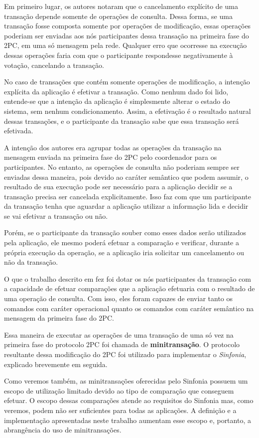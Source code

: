 \documentclass[11pt,twoside,a4paper]{book}
\begin{document}
Em primeiro lugar, os autores notaram que o cancelamento explícito de uma transação depende somente de operações de consulta. Dessa forma, se uma transação fosse composta somente por operações de modificação, essas operações poderiam ser enviadas aos nós participantes dessa transação na primeira fase do 2PC, em uma só mensagem pela rede. Qualquer erro que ocorresse na execução dessas operações faria com que o participante respondesse negativamente à votação, cancelando a transação.

No caso de transações que contém somente operações de modificação, a intenção explícita da aplicação é efetivar a transação. Como nenhum dado foi lido, entende-se que a intenção da aplicação é simplesmente alterar o estado do sistema, sem nenhum condicionamento. Assim, a efetivação é o resultado natural dessas transações, e o participante da transação sabe que essa transação será efetivada.

A intenção dos autores era agrupar todas as operações da transação na mensagem enviada na primeira fase do 2PC pelo coordenador para os participantes. No entanto, as operações de consulta não poderiam sempre ser enviadas dessa maneira, pois devido ao caráter semântico que podem assumir, o resultado de sua execução pode ser necessário para a aplicação decidir se a transação precisa ser cancelada explicitamente. Isso faz com que um participante da transação tenha que aguardar a aplicação utilizar a informação lida e decidir se vai efetivar a transação ou não.

Porém, se o participante da transação souber como esses dados serão utilizados pela aplicação, ele mesmo poderá efetuar a comparação e verificar, durante a própria execução da operação, se a aplicação iria solicitar um cancelamento ou não da transação.

O que o trabalho descrito em \cite{sinfonia} fez foi dotar os nós participantes da transação com a capacidade de efetuar comparações que a aplicação efetuaria com o resultado de uma operação de consulta. Com isso, eles foram capazes de enviar tanto os comandos com caráter operacional quanto os comandos com caráter semântico na mensagem da primeira fase do 2PC.

Essa maneira de executar as operações de uma transação de uma só vez na primeira fase do protocolo 2PC foi chamada de \textbf{minitransação}. O protocolo resultante dessa modificação do 2PC foi utilizado para implementar o \emph{Sinfonia}, explicado brevemente em seguida.

Como veremos também, as minitransações oferecidas pelo Sinfonia possuem um escopo de utilização limitado devido ao tipo de comparação que conseguem efetuar. O escopo dessas comparações atende ao requisitos do Sinfonia mas, como veremos, podem não ser suficientes para todas as aplicações. A definição e a implementação apresentadas neste trabalho aumentam esse escopo e, portanto, a abrangência do uso de minitransações.
\end{document}

